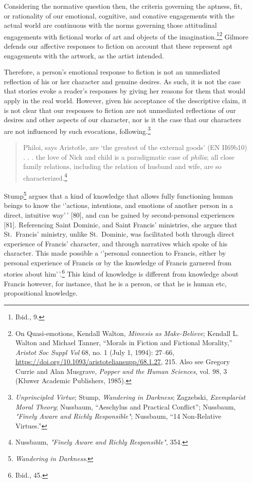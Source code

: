 \documentclass[phdthesis,12pt,final]{wuthesis}
\theoremstyle{definition}
\theoremstyle{definition}
\theoremstyle{definition}
\theoremstyle{definition}
\theoremstyle{remark}
\begin{document}
Considering the normative question then, the criteria governing the aptness, fit, or rationality of our emotional, cognitive, and conative engagements with the actual world are continuous with the norms governing those attitudinal engagements with fictional works of art and objects of the imagination.\footnote{Ibid., 9.}\footnote{On Quasi-emotions, Kendall Walton, \emph{Mimesis as {Make-Believe}}; Kendall L. Walton and Michael Tanner, {``Morals in {Fiction} and {Fictional Morality},''} \emph{Aristot Soc Suppl Vol} 68, no. 1 (July 1, 1994): 27--66, \url{https://doi.org/10.1093/aristoteliansupp/68.1.27}, 215. Also see Gregory Currie and Alan Musgrave, \emph{Popper and the Human Sciences}, vol. 98, 3 (Kluwer Academic Publishers, 1985).} Gilmore defends our affective responses to fiction on account that these represent apt engagements with the artwork, as the artist intended.

Therefore, a person's emotional response to fiction is not an unmediated reflection of his or her character and genuine desires. As such, it is not the case that stories evoke a reader's responses by giving her reasons for them that would apply in the real world. However, given his acceptance of the descriptive claim, it is not clear that our responses to fiction are not unmediated reflections of our desires and other aspects of our character, nor is it the case that our characters are not influenced by such evocations, following.\footnote{\emph{Unprincipled {Virtue}}; Stump, \emph{Wandering in {Darkness}}; Zagzebski, \emph{Exemplarist {Moral Theory}}; Nussbaum, {``Aeschylus and Practical Conflict''}; Nussbaum, \emph{"{Finely Aware} and {Richly Responsible}"}; Nussbaum, {``14 {Non-Relative Virtues}.''}}

\begin{quote}
Philoi, says Aristotle, are `the greatest of the external goods' (EN II69b10) . . . the love of Nick and child is a paradigmatic case of \emph{philia}; all close family relations, including the relation of husband and wife, are so characterized.\footnote{Nussbaum, \emph{"{Finely Aware} and {Richly Responsible}"}, 354.}
\end{quote}

Stump\footnote{\emph{Wandering in {Darkness}}.} argues that a kind of knowledge that allows fully functioning human beings to know the `'actions, intentions, and emotions of another person in a direct, intuitive way'\,' {[}80{]}, and can be gained by second-personal experiences
{[}81{]}. Referencing Saint Dominic, and Saint Francis' ministries, she argues that St.~Francis' ministry, unlike St.~Dominic, was facilitated both through
direct experience of Francis' character, and through narratives which
spoke of his character. This made possible a `'personal
connection to Francis, either by personal experience of Francis or by
the knowledge of Francis garnered from stories about him'\,'.\footnote{Ibid., 45.} This kind of knowledge is different from knowledge about Francis however, for
instance, that he is a person, or that he is human etc, propositional knowledge.
\end{document}

